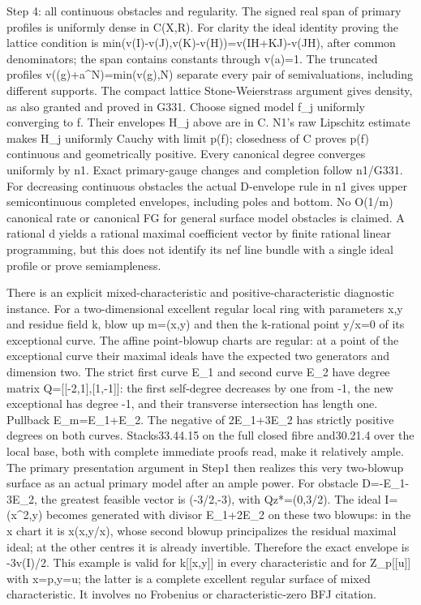 \documentclass[11pt]{article}
\begin{document}
Step 4: all continuous obstacles and regularity. The signed real span of primary profiles is uniformly dense in C(X,R). For clarity the ideal identity proving the lattice condition is min(v(I)-v(J),v(K)-v(H))=v(IH+KJ)-v(JH), after common denominators; the span contains constants through v(a)=1. The truncated profiles v((g)+a\textasciicircum{}N)=min(v(g),N) separate every pair of semivaluations, including different supports. The compact lattice Stone-Weierstrass argument gives density, as also granted and proved in G331. Choose signed model f\_j uniformly converging to f. Their envelopes H\_j above are in C. N1's raw Lipschitz estimate makes H\_j uniformly Cauchy with limit p(f); closedness of C proves p(f) continuous and geometrically positive. Every canonical degree converges uniformly by n1. Exact primary-gauge changes and completion follow n1/G331. For decreasing continuous obstacles the actual D-envelope rule in n1 gives upper semicontinuous completed envelopes, including poles and bottom. No O(1/m) canonical rate or canonical FG for general surface model obstacles is claimed. A rational d yields a rational maximal coefficient vector by finite rational linear programming, but this does not identify its nef line bundle with a single ideal profile or prove semiampleness.

There is an explicit mixed-characteristic and positive-characteristic diagnostic instance. For a two-dimensional excellent regular local ring with parameters x,y and residue field k, blow up m=(x,y) and then the k-rational point y/x=0 of its exceptional curve. The affine point-blowup charts are regular: at a point of the exceptional curve their maximal ideals have the expected two generators and dimension two. The strict first curve E\_1 and second curve E\_2 have degree matrix Q=[[-2,1],[1,-1]]: the first self-degree decreases by one from -1, the new exceptional has degree -1, and their transverse intersection has length one. Pullback E\_m=E\_1+E\_2. The negative of 2E\_1+3E\_2 has strictly positive degrees on both curves. Stacks33.44.15 on the full closed fibre and30.21.4 over the local base, both with complete immediate proofs read, make it relatively ample. The primary presentation argument in Step1 then realizes this very two-blowup surface as an actual primary model after an ample power. For obstacle D=-E\_1-3E\_2, the greatest feasible vector is (-3/2,-3), with Qz*=(0,3/2). The ideal I=(x\textasciicircum{}2,y) becomes generated with divisor E\_1+2E\_2 on these two blowups: in the x chart it is x(x,y/x), whose second blowup principalizes the residual maximal ideal; at the other centres it is already invertible. Therefore the exact envelope is -3v(I)/2. This example is valid for k[[x,y]] in every characteristic and for Z\_p[[u]] with x=p,y=u; the latter is a complete excellent regular surface of mixed characteristic. It involves no Frobenius or characteristic-zero BFJ citation.
\end{document}
